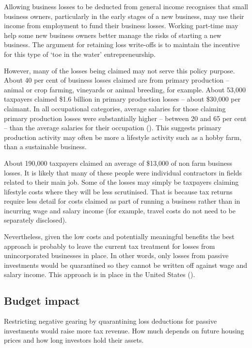 Allowing business losses to be deducted from general income recognises that small business owners, particularly in the early stages of a new business, may use their income from employment to fund their business losses. Working part-time may help some new business owners better manage the risks of starting a new business. The argument for retaining loss write-offs is to maintain the incentive for this type of ‘toe in the water’ entrepreneurship. 

However, many of the losses being claimed may not serve this policy purpose. About 40 per cent of business losses claimed are from primary production – animal or crop farming, vineyards or animal breeding, for example. About 53,000 taxpayers claimed \$1.6 billion in primary production losses – about \$30,000 per claimant. In all occupational categories, average salaries for those claiming primary production losses were substantially higher – between 20 and 65 per cent – than the average salaries for their occupation (). This suggests primary production activity may often be more a lifestyle activity such as a hobby farm, than a sustainable business.


About 190,000 taxpayers claimed an average of \$13,000 of non farm business losses. It is likely that many of these people were individual contractors in fields related to their main job. Some of the losses may simply be taxpayers claiming lifestyle costs where they will be less scrutinised. 
That is because tax returns require less detail for costs claimed as part of running a business rather than in incurring wage and salary income (for example, travel costs do not need to be separately disclosed). 

Nevertheless, given the low costs and potentially meaningful benefits the best approach is probably to leave the current tax treatment for losses from unincorporated businesses in place. 
In other words, only losses from passive investments would be quarantined so they cannot be written off against wage and salary income. 
This approach is in place in the United States (). 

\subsection{Budget impact}
Restricting negative gearing by quarantining loss deductions for passive investments would raise more tax revenue. How much depends on future housing prices and how long investors hold their assets.

